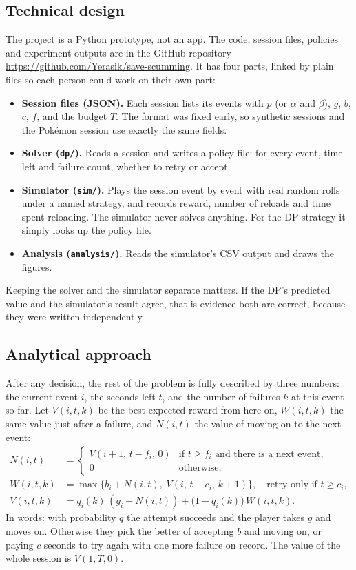 \documentclass[11pt,a4paper]{article}
\newcommand{\who}[1]{}
\begin{document}
\subsection{Technical design\who{Daniel}}
The project is a Python prototype, not an app. The code, session files, policies and experiment outputs are in the GitHub repository \url{https://github.com/Yerasik/save-scumming}. It has four parts, linked by plain files so each person could work on their own part:
\begin{itemize}
\item \textbf{Session files (JSON).} Each session lists its events with $p$ (or $\alpha$ and $\beta$), $g$, $b$, $c$, $f$, and the budget $T$. The format was fixed early, so synthetic sessions and the Pok\'emon session use exactly the same fields.
\item \textbf{Solver (\texttt{dp/}).} Reads a session and writes a policy file: for every event, time left and failure count, whether to retry or accept.
\item \textbf{Simulator (\texttt{sim/}).} Plays the session event by event with real random rolls under a named strategy, and records reward, number of reloads and time spent reloading. The simulator never solves anything. For the DP strategy it simply looks up the policy file.
\item \textbf{Analysis (\texttt{analysis/}).} Reads the simulator's CSV output and draws the figures.
\end{itemize}
Keeping the solver and the simulator separate matters. If the DP's predicted value and the simulator's result agree, that is evidence both are correct, because they were written independently.

\subsection{Analytical approach\who{Daniel}}
\label{sec:dp}
After any decision, the rest of the problem is fully described by three numbers: the current event $i$, the seconds left $t$, and the number of failures $k$ at this event so far. Let $V(i,t,k)$ be the best expected reward from here on, $W(i,t,k)$ the same value just after a failure, and $N(i,t)$ the value of moving on to the next event:
\begin{align}
N(i,t)
&=
\begin{cases}
V(i+1,\, t-f_i,\, 0)
& \text{if } t \ge f_i \text{ and there is a next event,}\\
0 & \text{otherwise,}
\end{cases}
\label{eq:N}\\[0.3em]
W(i,t,k)
&=
\max\bigl\{
b_i + N(i,t),\;
V(i,\, t-c_i,\, k+1)
\bigr\},
\quad\text{retry only if } t \ge c_i,
\label{eq:W}\\[0.3em]
V(i,t,k)
&=
q_i(k)\,(g_i + N(i,t))
+ \bigl(1-q_i(k)\bigr)\, W(i,t,k).
\label{eq:V}
\end{align}
In words: with probability $q$ the attempt succeeds and the player takes $g$ and moves on. Otherwise they pick the better of accepting $b$ and moving on, or paying $c$ seconds to try again with one more failure on record. The value of the whole session is $V(1,T,0)$.
\end{document}
